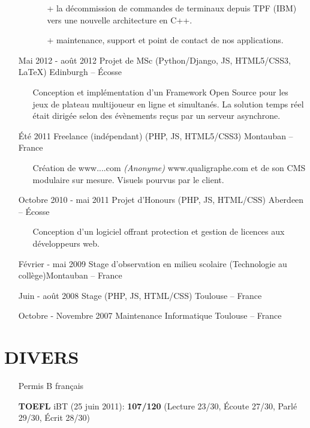 \documentclass{res}
\begin{document}
\begin{resume}
\begin{itemize}
\begin{itemize}
\begin{itemize}
				\item[+] la d\'ecommission de commandes de terminaux depuis TPF (IBM) vers une nouvelle architecture en C++.
				\item[+] maintenance, support et point de contact de nos applications.
			\end{itemize}
		\end{itemize}
		\item[] Mai 2012 - ao\^ut 2012 \tabto{5cm} Projet de MSc (Python/Django, JS, HTML5/CSS3, \LaTeX{}) \hfill Edinburgh -- \'Ecosse
		\begin{itemize}
			\item[] Conception et impl\'ementation d'un Framework Open Source pour les jeux de plateau multijoueur en ligne et simultan\'es. La solution temps r\'eel \'etait dirig\'ee selon des \'ev\`enements re\c{c}us par un serveur asynchrone.
		\end{itemize}
		\item[] \'Et\'e 2011 \tabto{5cm} Freelance (ind\'ependant) (PHP, JS, HTML5/CSS3) \hfill Montauban -- France
		\begin{itemize}
			\item[] Cr\'eation de \ifisanon www....com \textit{(Anonyme)} \else www.qualigraphe.com \fi et de son CMS modulaire sur mesure. Visuels pourvus par le client.
		\end{itemize}
		\item[] Octobre 2010 - mai 2011 \tabto{5cm} Projet d'Honours (PHP, JS, HTML/CSS) \hfill Aberdeen -- \'Ecosse
		\begin{itemize}
			\item[] Conception d'un logiciel offrant protection et gestion de licences aux d\'eveloppeurs web.
		\end{itemize}
		\item[] F\'evrier - mai 2009 \tabto{5cm} Stage d'observation en milieu scolaire (Technologie au coll\`ege)\hfill Montauban -- France
		\item[] Juin - ao\^ut 2008 \tabto{5cm} Stage (PHP, JS, HTML/CSS) \hfill Toulouse -- France
		\item[] Octobre - Novembre 2007 \tabto{5cm} Maintenance Informatique \hfill Toulouse -- France
	\end{itemize}
		
\section{DIVERS}  
	\begin{itemize}
		\item[] Permis B fran\c{c}ais
		\item[] \textbf{TOEFL} iBT (25 juin 2011): \textbf{107/120} (Lecture 23/30, \'Ecoute 27/30, Parl\'e 29/30, \'Ecrit 28/30)		
		    \end{itemize} 
 

\end{resume}
\end{document}
